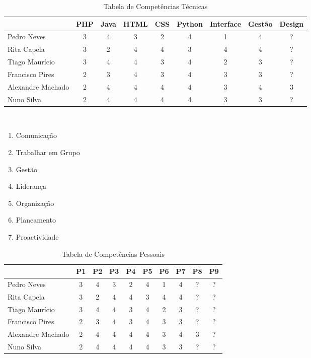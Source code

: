 \documentclass[12pt, a4paper, twoside]{report} %
\begin{document}
\begin{table}[h]
\centering
\begin{tabular}{|l|cccccccc|}
\hline
                  & PHP & Java & HTML & CSS & Python & Interface & Gestão & Design \\ \hline
Pedro Neves       & 3   & 4    & 3    & 2   & 4      & 1         & 4      & ?      \\ \hline
Rita Capela       & 3   & 2    & 4    & 4   & 3      & 4         & 4      & ?      \\ \hline
Tiago Maurício    & 3   & 4    & 4    & 3   & 4      & 2         & 3      & ?      \\ \hline
Francisco Pires   & 2   & 3    & 4    & 3   & 4      & 3         & 3      & ?      \\ \hline
Alexandre Machado & 2   & 4    & 4    & 4   & 4      & 3         & 4      & 3      \\ \hline
Nuno Silva        & 2   & 4    & 4    & 4   & 4      & 3         & 3      & ?      \\ \hline
\end{tabular}
\caption{Tabela de Competências Técnicas}
\label{competencias1}
\end{table}

\clearpage

\\
\begin{enumerate}
\item Comunicação
\item Trabalhar em Grupo
\item Gestão
\item Liderança
\item Organização
\item Planeamento
\item Proactividade
\end{enumerate}

\begin{table}[h]
\centering
\begin{tabular}{|l|ccccccccc|}
\hline
                  & P1 & P2 & P3 & P4 & P5 & P6 & P7 & P8 & P9 \\ \hline
Pedro Neves       & 3  & 4  & 3  & 2  & 4  & 1  & 4  & ?  & ?  \\ \hline
Rita Capela       & 3  & 2  & 4  & 4  & 3  & 4  & 4  & ?  & ?  \\ \hline
Tiago Maurício    & 3  & 4  & 4  & 3  & 4  & 2  & 3  & ?  & ?  \\ \hline
Francisco Pires   & 2  & 3  & 4  & 3  & 4  & 3  & 3  & ?  & ?  \\ \hline
Alexandre Machado & 2  & 4  & 4  & 4  & 4  & 3  & 4  & 3  & ?  \\ \hline
Nuno Silva        & 2  & 4  & 4  & 4  & 4  & 3  & 3  & ?  & ?  \\ \hline
\end{tabular}
\caption{Tabela de Competências Pessoais}
\label{competencias2}
\end{table}
\end{document}
